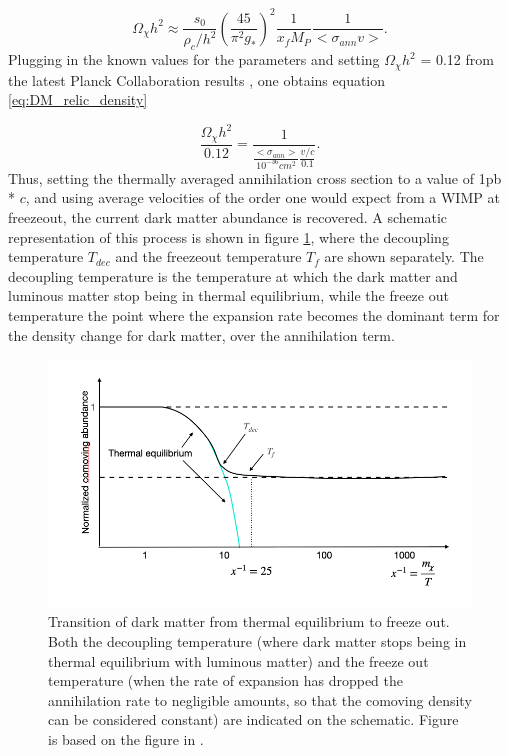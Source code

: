 \begin{equation}
    \label{eq:sol_Boltzmann}
    \Omega_\chi h^2 \approx \frac{s_0}{\rho_c/h^2} \left( \frac{45}{\pi^2g_*}\right)^2 \frac{1}{x_f M_P} \frac{1}{<\sigma_{ann}v>}.
\end{equation}
Plugging in the known values for the parameters \cite{Planck2020} and setting $\Omega_\chi h^2$ = 0.12 from the latest Planck Collaboration results \cite{Planck2020}, one obtains equation \ref{eq:DM_relic_density}

\begin{equation}
    \label{eq:DM_relic_density}
    \frac{\Omega_\chi h^2}{0.12} = \frac{1}{\frac{<\sigma_{ann}>}{10^{-36} cm^2} \frac{v/c}{0.1}}.
\end{equation}
Thus, setting the thermally averaged annihilation cross section to a value of 1pb * $c$, and using average velocities of the order one would expect from a WIMP at freezeout, the current dark matter abundance is recovered. A schematic representation of this process is shown in figure \ref{fig:DM_thremal_eq_freeze_out}, where the decoupling temperature $T_{dec}$ and the freezeout temperature $T_{f}$ are shown separately. The decoupling temperature is the temperature at which the dark matter and luminous matter stop being in thermal equilibrium, while the freeze out temperature the point where the expansion rate becomes the dominant term for the density change for dark matter, over the annihilation term. 

\begin{figure}[h!]
    \centering
    \includegraphics[width=\textwidth]{figures/schematic_thermal_eq_evolution_DM.png}
    \caption{Transition of dark matter from thermal equilibrium to freeze out. Both the decoupling temperature (where dark matter stops being in thermal equilibrium with luminous matter) and the freeze out temperature (when the rate of expansion has dropped the annihilation rate to negligible amounts, so that the comoving density can be considered constant) are indicated on the schematic. Figure is based on the figure in \cite{BAER20151}.}
    \label{fig:DM_thremal_eq_freeze_out}
\end{figure}



